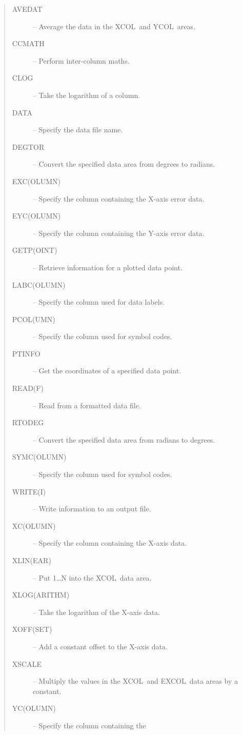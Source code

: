 \documentclass[twoside,11pt]{article}
\newcommand{\htmlref}[2]{#1}
\renewcommand{\_}{\texttt{\symbol{95}}}
\newcommand{\xcol}{{\sf XCOL}}
\newcommand{\excol}{{\sf EXCOL}}
\newcommand{\ycol}{{\sf YCOL}}
\newcommand{\iref} [1]{\htmlref{#1}{#1}}
\newcommand{\iiref}[2]{\htmlref{#1}{#2}}
\begin{document}
\small
\begin {quote}
  \begin {description}
  \item [\iref{AVEDAT}] -- Average the data in the \xcol\ and \ycol\ areas.
  \item [\iref{CCMATH}] -- Perform inter-column maths.
  \item [\iref{CLOG}] -- Take the logarithm of a column.
  \item [\iref{DATA}] -- Specify the data file name.
  \item [\iref{DEGTOR}] -- Convert the specified data area from degrees to
    radians.
  \item [\iiref{EXC(OLUMN)}{EXCOLUMN}] -- Specify the column containing
    the X-axis error data.
  \item [\iiref{EYC(OLUMN)}{EYCOLUMN}] -- Specify the column containing
    the Y-axis error data.
  \item [\iiref{GETP(OINT)}{GETPOINT}] -- Retrieve information for a
    plotted data point.
  \item [\iiref{LABC(OLUMN)}{LABCOLUMN}] -- Specify the column used for
    data labels.
  \item [\iiref{PCOL(UMN)}{PCOLUMN}] -- Specify the column used for
    symbol codes.
  \item [\iref{PTINFO}] -- Get the coordinates of a specified data point.
  \item [\iiref{READ(F)}{READF}] -- Read from a formatted data file.
  \item [\iref{RTODEG}] -- Convert the specified data area from radians to
    degrees.
  \item [\iiref{SYMC(OLUMN)}{SYMCOLUMN}] -- Specify the column used for
    symbol codes.
  \item [\iiref{WRITE(I)}{WRITEI}] -- Write information to an output file.
  \item [\iiref{XC(OLUMN)}{XCOLUMN}] -- Specify the column containing the
    X-axis data.
  \item [\iiref{XLIN(EAR)}{XLINEAR}] -- Put 1\ldots N into the \xcol\ data
    area.
  \item [\iiref{XLOG(ARITHM)}{XLOGARITHM}] -- Take the logarithm of the
    X-axis data.
  \item [\iiref{XOFF(SET)}{XLOGARITHM}] -- Add a constant offset to the
    X-axis data.
  \item [\iref{XSCALE}] -- Multiply the values in the \xcol\ and \excol\ data areas
    by a constant.
  \item [\iiref{YC(OLUMN)}{YCOLUMN}] -- Specify the column containing the

\end{description}
\end{quote}
\end{document}
